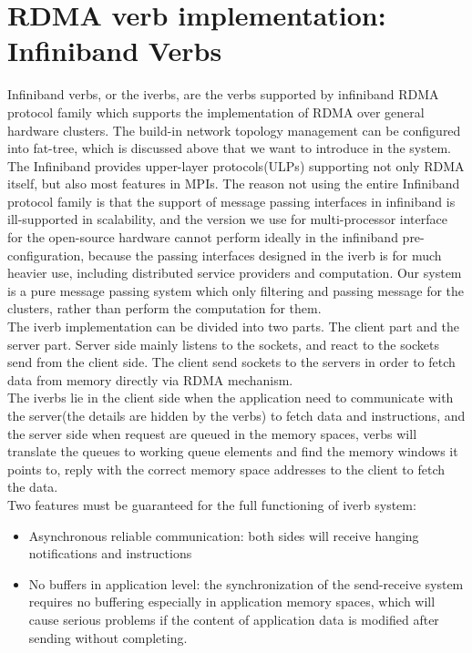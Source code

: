 \documentclass[11pt,openright,a4paper]{report}
\begin{document}
\section{RDMA verb implementation: Infiniband Verbs}
Infiniband verbs, or the iverbs, are the verbs supported by infiniband RDMA protocol family which supports the implementation of RDMA over general hardware clusters\cite{mitchell2013using}. The build-in network topology management can be configured into fat-tree, which is discussed above that we want to introduce in the system. \\
The Infiniband provides upper-layer protocols(ULPs) supporting not only RDMA itself, but also most features in MPIs\cite{liu2003performance}. The reason not using the entire Infiniband protocol family is that the support of message passing interfaces in infiniband is ill-supported in scalability, and the version we use for multi-processor interface for the open-source hardware cannot perform ideally in the infiniband pre-configuration, because the passing interfaces designed in the iverb is for much heavier use, including distributed service providers and computation. Our system is a pure message passing system which only filtering and passing message for the clusters, rather than perform the computation for them.\\
The iverb implementation can be divided into two parts\cite{bedeir2010building}. The client part and the server part. Server side mainly listens to the sockets, and react to the sockets send from the client side. The client send sockets to the servers in order to fetch data from memory directly via RDMA mechanism\cite{jiang2004efficient}.\\ 
The iverbs lie in the client side when the application need to communicate with the server(the details are hidden by the verbs) to fetch data and instructions, and the server side when request are queued in the memory spaces, verbs will translate the queues to working queue elements and find the memory windows it points to, reply with the correct memory space addresses to the client to fetch the data\cite{santhanaraman2008designing}.\\
Two features must be guaranteed for the full functioning of iverb system:
\begin{itemize}
	\item Asynchronous reliable communication: both sides will receive hanging notifications and instructions 
    \item No buffers in application level: the synchronization of the send-receive system requires no buffering especially in application memory spaces, which will cause serious problems if the content of application data is modified after sending without completing.
\end{itemize}
\end{document}
